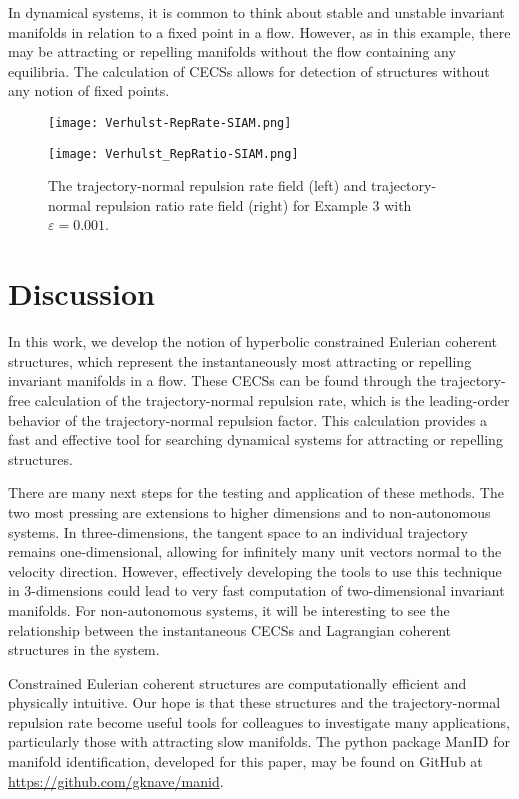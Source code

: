 \documentclass[onecolumn,3p]{elsarticle}
\begin{document}
	In dynamical systems, it is common to think about stable and unstable invariant manifolds in relation to a fixed point in a flow. However, as in this example, there may be attracting or repelling manifolds without the flow containing any equilibria. The calculation of CECSs allows for detection of structures without any notion of fixed points.
	
	\begin{figure*}[t!]
		\centering
		\begin{minipage}{0.45\textwidth}
			\centering
			\texttt{[image: Verhulst-RepRate-SIAM.png]}
		\end{minipage}
		\begin{minipage}{0.45\textwidth}
			\centering
			\texttt{[image: Verhulst\_RepRatio-SIAM.png]}
		\end{minipage}
		\caption{The trajectory-normal repulsion rate field (left) and trajectory-normal repulsion ratio rate field (right) for Example 3 with $\varepsilon=0.001$.}
		\label{fig: verhulst}
	\end{figure*}
	
	\section{Discussion}
	In this work, we develop the notion of hyperbolic constrained Eulerian coherent structures, which represent the instantaneously most attracting or repelling invariant manifolds in a flow. These CECSs can be found through the trajectory-free calculation of the trajectory-normal repulsion rate, which is the leading-order behavior of the trajectory-normal repulsion factor. This calculation provides a fast and effective tool for searching dynamical systems for attracting or repelling structures.
	
	There are many next steps for the testing and application of these methods. The two most pressing are extensions to higher dimensions and to non-autonomous systems. In three-dimensions, the tangent space to an individual trajectory remains one-dimensional, allowing for infinitely many unit vectors normal to the velocity direction. However, effectively developing the tools to use this technique in 3-dimensions could lead to very fast computation of two-dimensional invariant manifolds. For non-autonomous systems, it will be interesting to see the relationship between the instantaneous CECSs and Lagrangian coherent structures in the system.
	
	Constrained Eulerian coherent structures are computationally efficient and physically intuitive. Our hope is that these structures and the trajectory-normal repulsion rate become useful tools for colleagues to investigate many applications, particularly those with attracting slow manifolds. The python package ManID for manifold identification, developed for this paper, may be found on GitHub at \href{https://github.com/gknave/manid}{https://github.com/gknave/manid}.
	
\end{document}

